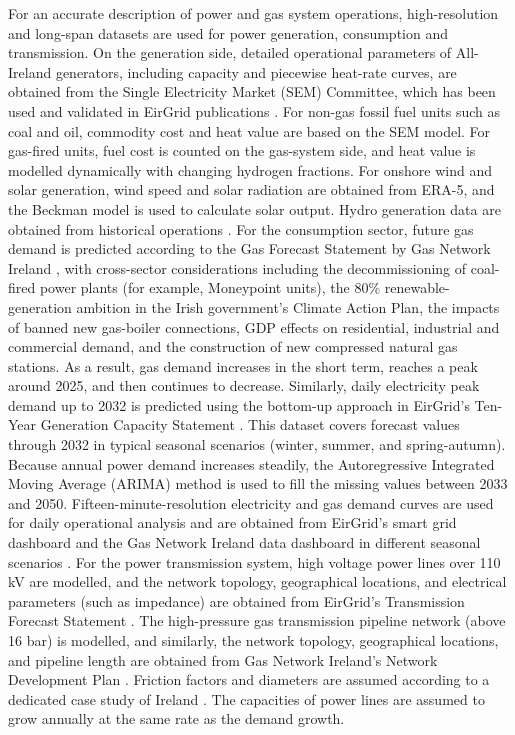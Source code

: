 \documentclass[pdflatex,sn-mathphys,Numbered]{sn-jnl}%
\begin{document}
For an accurate description of power and gas system operations, high-resolution and long-span datasets are used for power generation, consumption and transmission. On the generation side, detailed operational parameters of All-Ireland generators, including capacity and piecewise heat-rate curves, are obtained from the Single Electricity Market (SEM) Committee, which has been used and validated in EirGrid publications \cite{SEMPLEXOS}. For non-gas fossil fuel units such as coal and oil, commodity cost and heat value are based on the SEM model. For gas-fired units, fuel cost is counted on the gas-system side, and heat value is modelled dynamically with changing hydrogen fractions. For onshore wind and solar generation, wind speed and solar radiation are obtained from ERA-5, and the Beckman model is used to calculate solar output. Hydro generation data are obtained from historical operations \cite{SystemandRenewableDataReports}.
For the consumption sector, future gas demand is predicted according to the Gas Forecast Statement by Gas Network Ireland \cite{GasForecastStatement2022}, with cross-sector considerations including the decommissioning of coal-fired power plants (for example, Moneypoint units), the 80\% renewable-generation ambition in the Irish government's Climate Action Plan, the impacts of banned new gas-boiler connections, GDP effects on residential, industrial and commercial demand, and the construction of new compressed natural gas stations. As a result, gas demand increases in the short term, reaches a peak around 2025, and then continues to decrease.
Similarly, daily electricity peak demand up to 2032 is predicted using the bottom-up approach in EirGrid's Ten-Year Generation Capacity Statement \cite{GenerationCapacity}. This dataset covers forecast values through 2032 in typical seasonal scenarios (winter, summer, and spring-autumn). Because annual power demand increases steadily, the Autoregressive Integrated Moving Average (ARIMA) method is used to fill the missing values between 2033 and 2050. Fifteen-minute-resolution electricity and gas demand curves are used for daily operational analysis and are obtained from EirGrid's smart grid dashboard and the Gas Network Ireland data dashboard in different seasonal scenarios \cite{SmartGridDashboard, GasconsumptionbyMarketSector}.
For the power transmission system, high voltage power lines over 110 kV are modelled, and the network topology, geographical locations, and electrical parameters (such as impedance) are obtained from EirGrid's Transmission Forecast Statement \cite{AllIslandTenYear}. The high-pressure gas transmission pipeline network (above 16 bar) is modelled, and similarly, the network topology, geographical locations, and pipeline length are obtained from Gas Network Ireland's Network Development Plan \cite{NetworkDevelopmentPlan}. Friction factors and diameters are assumed according to a dedicated case study of Ireland \cite{ekhtiari2022green}. The capacities of power lines are assumed to grow annually at the same rate as the demand growth.
\end{document}
